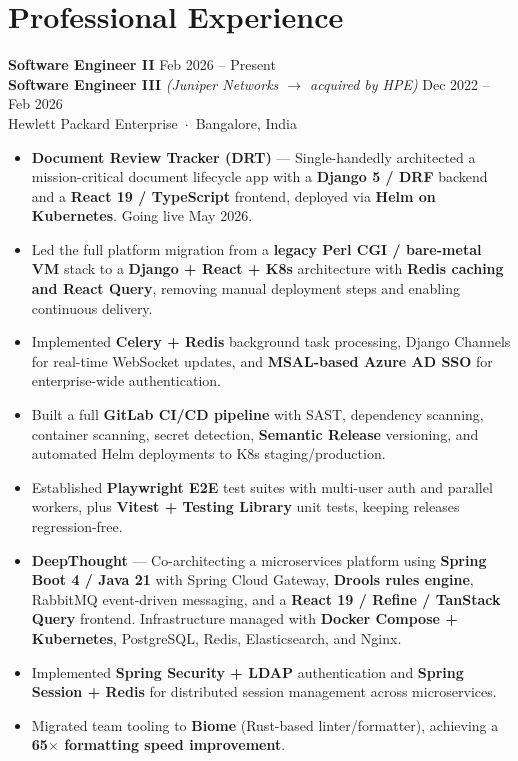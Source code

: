 \documentclass[a4paper,11pt]{article}
\begin{document}
\section{Professional Experience}

\noindent\textbf{Software Engineer II} \hfill Feb 2026 -- Present \\
\textbf{Software Engineer III} \textit{(Juniper Networks $\to$ acquired by HPE)} \hfill Dec 2022 -- Feb 2026 \\
{\color{muted} Hewlett Packard Enterprise \,$\cdot$\, Bangalore, India}
\begin{itemize}
  \item \textbf{Document Review Tracker (DRT)} --- Single-handedly architected a mission-critical document lifecycle app with a \textbf{Django 5 / DRF} backend and a \textbf{React 19 / TypeScript} frontend, deployed via \textbf{Helm on Kubernetes}. Going live May 2026.
  \item Led the full platform migration from a \textbf{legacy Perl CGI / bare-metal VM} stack to a \textbf{Django + React + K8s} architecture with \textbf{Redis caching and React Query}, removing manual deployment steps and enabling continuous delivery.
  \item Implemented \textbf{Celery + Redis} background task processing, Django Channels for real-time WebSocket updates, and \textbf{MSAL-based Azure AD SSO} for enterprise-wide authentication.
  \item Built a full \textbf{GitLab CI/CD pipeline} with SAST, dependency scanning, container scanning, secret detection, \textbf{Semantic Release} versioning, and automated Helm deployments to K8s staging/production.
  \item Established \textbf{Playwright E2E} test suites with multi-user auth and parallel workers, plus \textbf{Vitest + Testing Library} unit tests, keeping releases regression-free.
  \item \textbf{DeepThought} --- Co-architecting a microservices platform using \textbf{Spring Boot 4 / Java 21} with Spring Cloud Gateway, \textbf{Drools rules engine}, RabbitMQ event-driven messaging, and a \textbf{React 19 / Refine / TanStack Query} frontend. Infrastructure managed with \textbf{Docker Compose + Kubernetes}, PostgreSQL, Redis, Elasticsearch, and Nginx.
  \item Implemented \textbf{Spring Security + LDAP} authentication and \textbf{Spring Session + Redis} for distributed session management across microservices.
  \item Migrated team tooling to \textbf{Biome} (Rust-based linter/formatter), achieving a \textbf{65$\times$ formatting speed improvement}.
\end{itemize}
\end{document}
